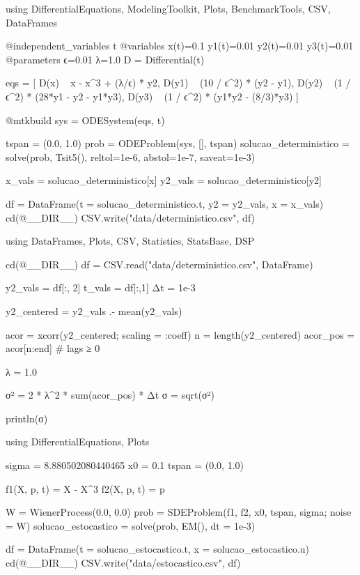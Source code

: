 \begin{juliacode}[caption={Modelo determinístico browniano acoplado}]
using DifferentialEquations, ModelingToolkit, Plots, BenchmarkTools, CSV, DataFrames

@independent_variables t
@variables x(t)=0.1 y1(t)=0.01 y2(t)=0.01 y3(t)=0.01
@parameters ϵ=0.01 λ=1.0
D = Differential(t)

eqs = [
    D(x) ~  x - x^3 + (λ/ϵ) * y2,
    D(y1) ~ (10 / ϵ^2) * (y2 - y1),
    D(y2) ~ (1 / ϵ^2) * (28*y1 - y2 - y1*y3),  
    D(y3) ~ (1 / ϵ^2) * (y1*y2 - (8/3)*y3)
]

@mtkbuild sys = ODESystem(eqs, t)

tspan = (0.0, 1.0)
prob = ODEProblem(sys, [], tspan)
solucao_deterministico = solve(prob, Tsit5(), reltol=1e-6, abstol=1e-7, saveat=1e-3)

x_vals = solucao_deterministico[x]
y2_vals = solucao_deterministico[y2]

df = DataFrame(t = solucao_deterministico.t, y2 = y2_vals, x = x_vals)
cd(@__DIR__)  
CSV.write("data/deterministico.csv", df)
\end{juliacode}

\begin{juliacode}[caption={Cálculo do sigma}]
using DataFrames, Plots, CSV, Statistics, StatsBase, DSP

cd(@__DIR__)
df = CSV.read("data/deterministico.csv", DataFrame)

y2_vals = df[:, 2]
t_vals = df[:,1]
Δt = 1e-3

y2_centered = y2_vals .- mean(y2_vals)

acor = xcorr(y2_centered; scaling = :coeff)
n = length(y2_centered)
acor_pos = acor[n:end]  # lags ≥ 0

λ = 1.0

σ² = 2 * λ^2 * sum(acor_pos) * Δt
σ = sqrt(σ²)

println(σ)
\end{juliacode}

\begin{juliacode}[caption={Modelo estocastico browniano acoplado}]
using DifferentialEquations, Plots

sigma = 8.880502080440465
x0 = 0.1
tspan = (0.0, 1.0)

f1(X, p, t) = X - X^3
f2(X, p, t) = p

W = WienerProcess(0.0, 0.0)
prob = SDEProblem(f1, f2, x0, tspan, sigma; noise = W)
solucao_estocastico = solve(prob, EM(), dt = 1e-3)

df = DataFrame(t = solucao_estocastico.t, x = solucao_estocastico.u)
cd(@__DIR__)  
CSV.write("data/estocastico.csv", df)
\end{juliacode}